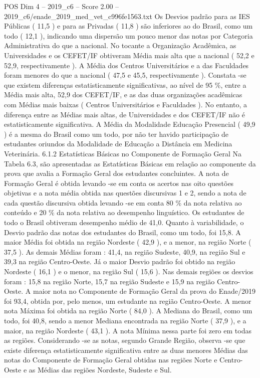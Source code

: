 \begin{textsample}{POS Dim 4 – 2019\_c6 – Score 2.00 – 2019\_c6/enade\_2019\_med\_vet\_c996fe1563.txt}
Os Desvios padrão para as IES Públicas ( 11,5 ) e para as Privadas ( 11,8 ) são inferiores ao do Brasil, como um todo ( 12,1 ), indicando uma dispersão um pouco menor das notas por Categoria Administrativa do que a nacional.
No tocante a Organização Acadêmica, as Universidades e os CEFET/IF obtiveram Média mais alta que a nacional ( 52,2 e 52,9, respectivamente ).
A Média dos Centros Universitários e a das Faculdades foram menores do que a nacional ( 47,5 e 45,5, respectivamente ).
Constata -se que existem diferenças estatisticamente significativas, ao nível de 95 \%, entre a Média mais alta, 52,9 dos CEFET/IF, e as das duas organizações acadêmicas com Médias mais baixas ( Centros Universitários e Faculdades ).
No entanto, a diferença entre as Médias mais altas, de Universidades e dos CEFET/IF não é estatisticamente significativa.
A Média da Modalidade Educação Presencial ( 49,9 ) é a mesma do Brasil como um todo, por não ter havido participação de estudantes oriundos da Modalidade de Educação a Distância em Medicina Veterinária. 6.1.2 Estatísticas Básicas no Componente de Formação Geral Na Tabela 6.3, são apresentadas as Estatísticas Básicas em relação ao componente da prova que avalia a Formação Geral dos estudantes concluintes.
A nota de Formação Geral é obtida levando -se em conta os acertos nas oito questões objetivas e a nota média obtida nas questões discursivas 1 e 2, sendo a nota de cada questão discursiva obtida levando -se em conta 80 \% da nota relativa ao conteúdo e 20 \% da nota relativa ao desempenho linguístico.
Os estudantes de todo o Brasil obtiveram desempenho médio de 41,0.
Quanto à variabilidade, o Desvio padrão das notas dos estudantes do Brasil, como um todo, foi 15,8.
A maior Média foi obtida na região Nordeste ( 42,9 ), e a menor, na região Norte ( 37,5 ).
As demais Médias foram : 41,4, na região Sudeste, 40,9, na região Sul e 39,3 na região Centro-Oeste.
Já o maior Desvio padrão foi obtido na região Nordeste ( 16,1 ) e o menor, na região Sul ( 15,6 ).
Nas demais regiões os desvios foram : 15,8 na região Norte, 15,7 na região Sudeste e 15,9 na região Centro-Oeste.
A maior nota no Componente de Formação Geral da prova do Enade/2019 foi 93,4, obtida por, pelo menos, um estudante na região Centro-Oeste.
A menor nota Máxima foi obtida na região Norte ( 84,0 ).
A Mediana do Brasil, como um todo, foi 40,8, sendo a menor Mediana encontrada na região Norte ( 37,9 ), e a maior, na região Nordeste ( 43,1 ).
A nota Mínima nessa parte foi zero em todas as regiões.
Considerando -se as notas, segundo Grande Região, observa -se que existe diferença estatisticamente significativa entre as duas menores Médias das notas do Componente de Formação Geral obtidas nas regiões Norte e Centro-Oeste e as Médias das regiões Nordeste, Sudeste e Sul.

\end{textsample}
